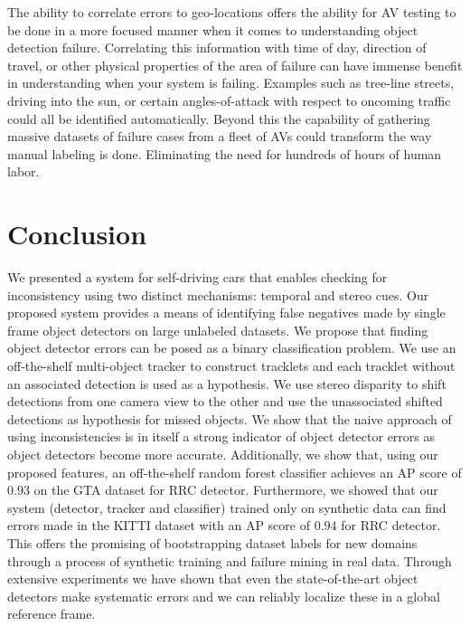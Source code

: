 \documentclass[letterpaper, 10 pt, journal, twoside]{IEEEtran}  %
\begin{document}
The ability to correlate errors to geo-locations offers the ability for AV testing to be done in a more focused manner when it comes to understanding object detection failure. Correlating this information with time of day, direction of travel, or other physical properties of the area of failure can have immense benefit in understanding when your system is failing. Examples such as tree-line streets, driving into the sun, or certain angles-of-attack with respect to oncoming traffic could all be identified automatically. Beyond this the capability of gathering massive datasets of failure cases from a fleet of AVs could transform the way manual labeling is done. Eliminating the need for hundreds of hours of human labor.


\section{Conclusion}
\label{sec:conclusion}
We presented a system for self-driving cars that enables checking for inconsistency using two distinct mechanisms: temporal and stereo cues. Our proposed system provides a means of identifying false negatives made by single frame object detectors on large unlabeled datasets. We propose that finding object detector errors can be posed as a binary classification problem. 
We use an off-the-shelf multi-object tracker to construct tracklets and each tracklet without an associated detection is used as a hypothesis. We use stereo disparity to shift detections from one camera view to the other and use the unassociated shifted detections as hypothesis for missed objects. We show that the naive approach of using inconsistencies is in itself a strong indicator of object detector errors as object detectors become more accurate. Additionally, we show that, using our proposed features, an off-the-shelf random forest classifier achieves an AP score of $0.93$ on the GTA dataset for RRC detector. Furthermore, we showed that our system (detector, tracker and classifier) trained only on synthetic data can find errors made in the KITTI dataset with an AP score of $0.94$ for RRC detector. This offers the promising of bootstrapping dataset labels for new domains through a process of synthetic training and failure mining in real data. Through extensive experiments we have shown that even the state-of-the-art object detectors make systematic errors and we can reliably localize these in a global reference frame.
\end{document}
